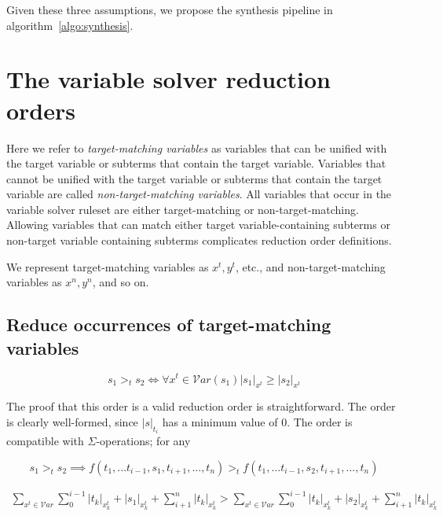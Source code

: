 Given these three assumptions, we propose the synthesis pipeline in algorithm~\ref{algo:synthesis}. 



\section{The variable solver reduction orders}

Here we refer to \emph{target-matching variables} as variables that can be unified with the target variable or subterms that contain the target variable. Variables that cannot be unified with the target variable or subterms that contain the target variable are called \emph{non-target-matching variables}. All variables that occur in the variable solver ruleset are either target-matching or non-target-matching. Allowing variables that can match either target variable-containing subterms or non-target variable containing subterms complicates reduction order definitions. 

We represent target-matching variables as $x^t, y^t$, etc., and non-target-matching variables as $x^n, y^n$, and so on.

\subsection{Reduce occurrences of target-matching variables}

\[ s_1 >_t s_2 \iff \forall x^t \in \mathcal{V}ar(s_1) |s_1|_{x^t} \geq |s_2|_{x^t}
\]

The proof that this order is a valid reduction order is straightforward. The order is clearly well-formed, since $|s|_{t_i}$ has a minimum value of 0. The order is compatible with $\Sigma$-operations; for any

\[ s_1 >_t s_2 \implies f(t_1,...t_{i-1},s_1,t_{i+1},...,t_n) >_t f(t_1,...t_{i-1},s_2,t_{i+1},...,t_n)
\]

\begin{align*}
\sum_{x^t \in \mathcal{V}ar} \sum_{0}^{i - 1} |t_k|_{x^t_k} + |s_1|_{x^t_k} + \sum_{i + 1}^{n} |t_k|_{x^t_k} >
\sum_{x^t \in \mathcal{V}ar} \sum_{0}^{i - 1} |t_k|_{x^t_k} + |s_2|_{x^t_k} + \sum_{i + 1}^{n} |t_k|_{x^t_k}
\end{align*}

